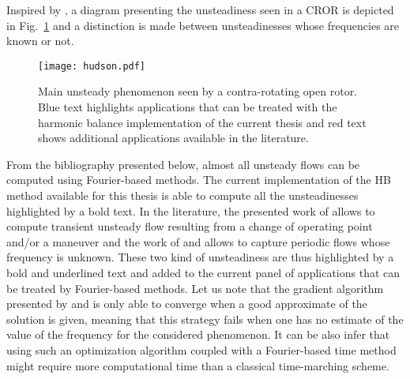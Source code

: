 
Inspired by \citet{Hodson1998},
a diagram presenting the unsteadiness seen in 
a CROR is depicted in Fig.~\ref{fig:hudson} and a distinction
is made between unsteadinesses whose frequencies are
known or not.
\begin{figure}[htbp]
  \centering
  \texttt{[image: hudson.pdf]}
  \caption{Main unsteady phenomenon seen by a contra-rotating
  open rotor. Blue text highlights applications that can
  be treated with the harmonic balance implementation of the
  current thesis and red text shows additional applications
  available in the literature.}
  \label{fig:hudson}
\end{figure}
From the bibliography presented below, almost all
unsteady flows can be computed using Fourier-based methods.
The current implementation of the HB method available for
this thesis is able to compute all the unsteadinesses highlighted
by a bold text. In the literature, the presented work of 
\citet{Mavriplis2012} allows to compute transient unsteady flow
resulting from a change of operating point and/or a maneuver and
the work of \citet{McMullen2002} and \citet{Gopinath2006} allows
to capture periodic flows whose frequency is unknown. These two
kind of unsteadiness are thus highlighted by a bold and underlined
text and added
to the current panel of applications that can
be treated by Fourier-based methods. Let us note
that the gradient algorithm presented by \citet{McMullen2002}
and \citet{Gopinath2006} is only able to converge when a 
good approximate of the solution is given, meaning
that this strategy fails when one has no estimate
of the value of the frequency for the considered phenomenon.
It can be also infer that using such an optimization algorithm
coupled with a Fourier-based time method
might require more computational time than a classical time-marching scheme.


